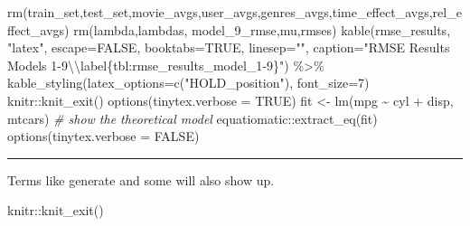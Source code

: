\documentclass[
]{article}
\newenvironment{Shaded}{}{}
\newcommand{\AttributeTok}[1]{\textcolor[rgb]{0.49,0.56,0.16}{#1}}
\newcommand{\CommentTok}[1]{\textcolor[rgb]{0.38,0.63,0.69}{\textit{#1}}}
\newcommand{\ConstantTok}[1]{\textcolor[rgb]{0.53,0.00,0.00}{#1}}
\newcommand{\DecValTok}[1]{\textcolor[rgb]{0.25,0.63,0.44}{#1}}
\newcommand{\FunctionTok}[1]{\textcolor[rgb]{0.02,0.16,0.49}{#1}}
\newcommand{\NormalTok}[1]{#1}
\newcommand{\OtherTok}[1]{\textcolor[rgb]{0.00,0.44,0.13}{#1}}
\newcommand{\SpecialCharTok}[1]{\textcolor[rgb]{0.25,0.44,0.63}{#1}}
\newcommand{\StringTok}[1]{\textcolor[rgb]{0.25,0.44,0.63}{#1}}
\begin{document}
\begin{Shaded}
\begin{Highlighting}[]
\FunctionTok{rm}\NormalTok{(train\_set,test\_set,movie\_avgs,user\_avgs,genres\_avgs,time\_effect\_avgs,rel\_effect\_avgs)}
\FunctionTok{rm}\NormalTok{(lambda,lambdas, model\_9\_rmse,mu,rmses)}
  \FunctionTok{kable}\NormalTok{(rmse\_results, }\StringTok{"latex"}\NormalTok{, }\AttributeTok{escape=}\ConstantTok{FALSE}\NormalTok{, }\AttributeTok{booktabs=}\ConstantTok{TRUE}\NormalTok{, }\AttributeTok{linesep=}\StringTok{""}\NormalTok{, }\AttributeTok{caption=}\StringTok{"RMSE Results Models 1{-}9}\SpecialCharTok{\textbackslash{}\textbackslash{}}\StringTok{label\{tbl:rmse\_results\_model\_1{-}9\}"}\NormalTok{) }\SpecialCharTok{\%\textgreater{}\%}
    \FunctionTok{kable\_styling}\NormalTok{(}\AttributeTok{latex\_options=}\FunctionTok{c}\NormalTok{(}\StringTok{"HOLD\_position"}\NormalTok{), }\AttributeTok{font\_size=}\DecValTok{7}\NormalTok{)}
\NormalTok{    knitr}\SpecialCharTok{::}\FunctionTok{knit\_exit}\NormalTok{()}
\FunctionTok{options}\NormalTok{(}\AttributeTok{tinytex.verbose =} \ConstantTok{TRUE}\NormalTok{)}
\NormalTok{fit }\OtherTok{\textless{}{-}} \FunctionTok{lm}\NormalTok{(mpg }\SpecialCharTok{\textasciitilde{}}\NormalTok{ cyl }\SpecialCharTok{+}\NormalTok{ disp, mtcars)}
\CommentTok{\# show the theoretical model}
\NormalTok{equatiomatic}\SpecialCharTok{::}\FunctionTok{extract\_eq}\NormalTok{(fit)}
\FunctionTok{options}\NormalTok{(}\AttributeTok{tinytex.verbose =} \ConstantTok{FALSE}\NormalTok{)}
\end{Highlighting}
\end{Shaded}

\begin{center}\rule{0.5\linewidth}{0.5pt}\end{center}

\newpage

Terms like generate and some will also
show up.

\printindex

\begin{Shaded}
\begin{Highlighting}[]
\NormalTok{    knitr}\SpecialCharTok{::}\FunctionTok{knit\_exit}\NormalTok{()}
\end{Highlighting}
\end{Shaded}
\end{document}
